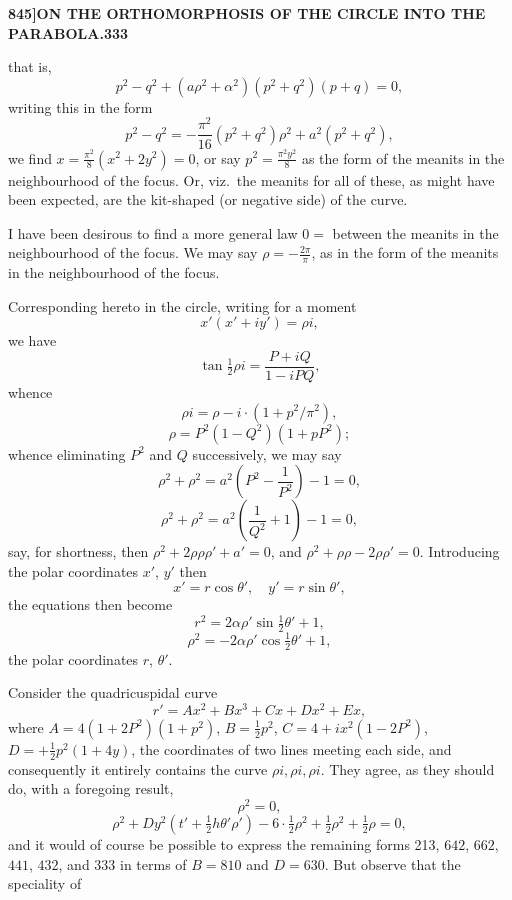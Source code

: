 \documentclass[11pt,a4paper]{book}
\begin{document}
\newpage
\setcounter{page}{333}

\noindent\textbf{845]}\hfill\textbf{ON THE ORTHOMORPHOSIS OF THE CIRCLE INTO THE PARABOLA.}\hfill\textbf{333}

\bigskip

\noindent that is,
\[
p^2 - q^2 + (a\rho^2 + \alpha^2)(p^2 + q^2)(p + q) = 0,
\]
writing this in the form
\[
p^2 - q^2 = -\frac{\pi^2}{16}(p^2 + q^2)\rho^2 + a^2(p^2 + q^2),
\]
we find $x = \frac{\pi^2}{8}(x^2 + 2y^2) = 0$, or say $p^2 = \frac{\pi^2 y^2}{8}$ as the form of the meanits in the neighbourhood of the focus. Or, viz.\ the meanits for all of these, as might have been expected, are the kit-shaped (or negative side) of the curve.

I have been desirous to find a more general law $0 = $ between the meanits in the neighbourhood of the focus. We may say $\rho = -\frac{2\pi}{\pi}$, as in the form of the meanits in the neighbourhood of the focus.

Corresponding hereto in the circle, writing for a moment
\[
x'(x' + iy') = \rho i,
\]
we have
\[
\tan\tfrac{1}{2}\rho i = \frac{P + iQ}{1 - iPQ},
\]
whence
\[
\rho i = \rho - i \cdot (1 + p^2/\pi^2),
\]
\[
\rho = P^2(1 - Q^2)(1 + pP^2);
\]
whence eliminating $P^2$ and $Q$ successively, we may say
\[
\rho^2 + \rho^2 = a^2 \left(P^2 - \frac{1}{P^2}\right) - 1 = 0,
\]
\[
\rho^2 + \rho^2 = a^2 \left(\frac{1}{Q^2} + 1\right) - 1 = 0,
\]
say, for shortness, then $\rho^2 + 2\rho\rho\rho' + a' = 0$, and $\rho^2 + \rho\rho - 2\rho\rho' = 0$. Introducing the polar coordinates $x'$, $y'$ then
\[
x' = r\cos\theta', \quad y' = r\sin\theta',
\]
the equations then become
\[
r^2 = 2\alpha\rho'\sin\tfrac{1}{2}\theta' + 1,
\]
\[
\rho^2 = -2\alpha\rho'\cos\tfrac{1}{2}\theta' + 1,
\]
the polar coordinates $r$, $\theta'$.

Consider the quadricuspidal curve
\[
r' = Ax^2 + Bx^3 + Cx + Dx^2 + Ex,
\]
where $A = 4(1 + 2P^2) (1 + p^2)$, $B = \frac{1}{2}p^2$, $C = 4 + ix^2(1 - 2P^2)$, $D = +\frac{1}{2}p^2(1 + 4y)$, the coordinates of two lines meeting each side, and consequently it entirely contains the curve $\rho i, \rho i, \rho i$. They agree, as they should do, with a foregoing result,
\[
\rho^2 = 0,
\]
\[
\rho^2 + Dy^2(t' + \tfrac{1}{2}h\theta'\rho') - 6 \cdot \tfrac{1}{2}\rho^2 + \tfrac{1}{2}\rho^2 + \tfrac{1}{2}\rho = 0,
\]
and it would of course be possible to express the remaining forms 213, $642$, $662$, $441$, $432$, and $333$ in terms of $B = 810$ and $D = 630$. But observe that the speciality of

\newpage
\setcounter{page}{334}
\end{document}
